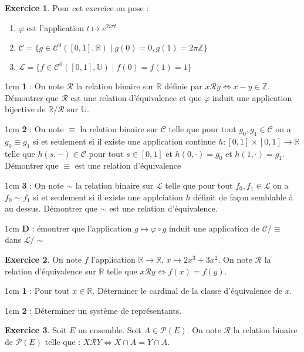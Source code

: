 \documentclass{report}
\newcommand{\Z}{\mathbb{Z}}
\newcommand{\R}{\mathbb{R}}
\newcommand{\CC}{\mathcal{C}}
\theoremstyle{definition}
\newtheorem{exo}{Exercice}
\newenvironment{q}[1]{
    \begin{adjustwidth}{1cm}{}
    \textbf{#1} : }{
    \end{adjustwidth}}
\newcommand{\itt}{\item[\(\triangleright\)]}
\begin{document}
\begin{exo}
    Pour cet exercice on pose :
    \begin{enumerate}
        \itt \(\varphi\) est l'application \(t\mapsto e^{2i\pi t}\)
        \itt \(\mathcal{C} = \{g\in\CC^0\left([0,1],\R\right)\mid g(0)=0, g(1)=2\pi\Z\}\)
        \itt \(\mathcal{L}=\{f\in\CC^0\left([0,1],\mathbb{U}\right)\mid f(0)=f(1)=1\}\)
    \end{enumerate}
    \begin{q}{1}
        On note \(\mathcal{R}\) la relation binaire sur \(\R\) définie par \(x\mathcal{R}y\Leftrightarrow x-y\in\Z\).
        Démontrer que \(\mathcal{R}\) est une relation d'équivalence et que
        \(\varphi\) induit une application bijective de \(\R/\mathcal{R}\) sur \(\mathbb{U}\).
    \end{q}
    \begin{q}{2}
        On note \(\equiv\) la relation binaire sur \(\CC\) telle que pour tout \(g_0, g_1\in\CC\) on a \(g_0\equiv g_1\)
        si et seulement si il existe une application continue \(h: [0,1] \times [0,1] \to \R\) telle que
        \(h(s,-)\in\CC\) pour tout \(s\in[0,1]\) et \(h(0,\cdot)=g_0\) et
        \(h(1,\cdot)=g_1\). Démontrer que \(\equiv\) est une relation d'équivalence
    \end{q}
    \begin{q}{3}
        On note \(\sim\) la relation binaire sur \(\mathcal{L}\) telle que
        pour tout \(f_0,f_1\in\mathcal{L}\) on a \(f_0\sim f_1\) si et seulement si
        il existe une applciation \(h\) définit de façon semblable à au dessus.
        Démontrer que \(\sim\) est une relation d'équivalence.
    \end{q}
    \begin{q}
        Démontrer que l'application \(g\mapsto \varphi\circ g\) induit
        une application de \(\CC/\equiv\) dans \(\mathcal{L}/\sim\)
    \end{q}
\end{exo}

\begin{exo}
    On note \(f\) l'application \(\R\to\R\), \(x\mapsto 2x^3+3x^2\). On note \(\mathcal{R}\)
    la relation d'équivalence sur \(\R\) telle que \(x\mathcal{R}y\Leftrightarrow f(x)=f(y)\).
    \begin{q}{1}
        Pour tout \(x\in\R\). Déterminer le cardinal de la classe d'équivalence de \(x\).
    \end{q}
    \begin{q}{2}
        Déterminer un système de représentants.
    \end{q}
\end{exo}

\begin{exo}
    Soit \(E\) un ensemble. Soit \(A\in\mathcal{P}(E)\). On note \(\mathcal{R}\) la relation binaire de \(\mathcal{P}(E)\)
    telle que : \(X\mathcal{R}Y \Leftrightarrow X\cap A = Y\cap A\).
\end{exo}
\end{document}
